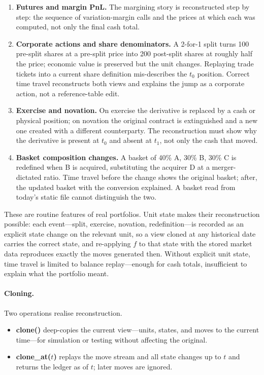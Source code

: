 \documentclass[11pt,a4paper]{article}
\begin{document}
\begin{enumerate}
\item \textbf{Futures and margin PnL.} The margining story is reconstructed step by step: the sequence of variation-margin calls and the prices at which each was computed, not only the final cash total.
\item \textbf{Corporate actions and share denominators.} A 2-for-1 split turns 100 pre-split shares at a pre-split price into 200 post-split shares at roughly half the price; economic value is preserved but the unit changes. Replaying trade tickets into a current share definition mis-describes the $t_0$ position. Correct time travel reconstructs both views and explains the jump as a corporate action, not a reference-table edit.
\item \textbf{Exercise and novation.} On exercise the derivative is replaced by a cash or physical position; on novation the original contract is extinguished and a new one created with a different counterparty. The reconstruction must show why the derivative is present at $t_0$ and absent at $t_1$, not only the cash that moved.
\item \textbf{Basket composition changes.} A basket of 40\% A, 30\% B, 30\% C is redefined when B is acquired, substituting the acquirer D at a merger-dictated ratio. Time travel before the change shows the original basket; after, the updated basket with the conversion explained. A basket read from today's static file cannot distinguish the two.
\end{enumerate}

These are routine features of real portfolios. Unit state makes their reconstruction possible: each event---split, exercise, novation, redefinition---is recorded as an explicit state change on the relevant unit, so a view cloned at any historical date carries the correct state, and re-applying $f$ to that state with the stored market data reproduces exactly the moves generated then. Without explicit unit state, time travel is limited to balance replay---enough for cash totals, insufficient to explain what the portfolio meant.

\paragraph{Cloning.} Two operations realise reconstruction.

\begin{itemize}[nosep]
\item \textbf{clone()} deep-copies the current view---units, states, and moves to the current time---for simulation or testing without affecting the original.
\item \textbf{clone\_at($t$)} replays the move stream and all state changes up to $t$ and returns the ledger as of $t$; later moves are ignored.
\end{itemize}
\end{document}
